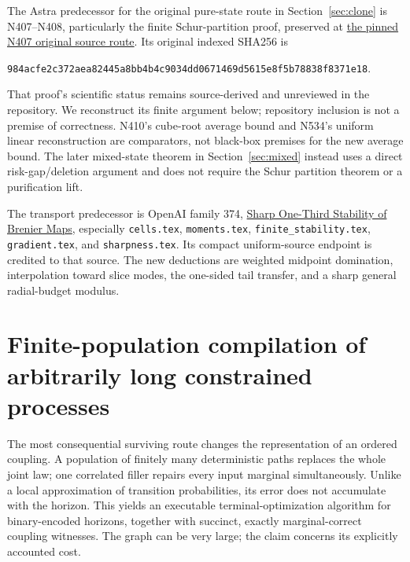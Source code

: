 \documentclass[11pt]{article}
\begin{document}
The Astra predecessor for the original pure-state route in Section~\ref{sec:clone} is N407--N408, particularly the finite Schur-partition proof, preserved at
\href{https://github.com/harjassand/astra-research-knowledge/blob/b2a7a8fa91a8fcf6da05f36100ae4ce64a72a729/web/pages/d-2115f1527533d2f7.html}{the pinned N407 original source route}.
Its original indexed SHA256 is
\begin{center}\small\texttt{984acfe2c372aea82445a8bb4b4c9034dd0671469d5615e8f5b78838f8371e18}.
\end{center}
That proof's scientific status remains source-derived and unreviewed in the repository. We reconstruct its finite argument below; repository inclusion is not a premise of correctness. N410's cube-root average bound and N534's uniform linear reconstruction are comparators, not black-box premises for the new average bound. The later mixed-state theorem in Section~\ref{sec:mixed} instead uses a direct risk-gap/deletion argument and does not require the Schur partition theorem or a purification lift.

The transport predecessor is OpenAI family 374,
\href{https://github.com/openai/math/tree/fd4aeeb2ee4fc729c18d98444fed42fd0529eeeb/preprints/Sharp-One-Third-Stability-of-Brenier-Maps-September-25-2026/build/source/sections}{Sharp One-Third Stability of Brenier Maps}, especially \texttt{cells.tex}, \texttt{moments.tex}, \texttt{finite\_stability.tex}, \texttt{gradient.tex}, and \texttt{sharpness.tex}. Its compact uniform-source endpoint is credited to that source. The new deductions are weighted midpoint domination, interpolation toward slice modes, the one-sided tail transfer, and a sharp general radial-budget modulus.

\section{Finite-population compilation of arbitrarily long constrained processes}\label{sec:population}

The most consequential surviving route changes the representation of an ordered coupling. A population of finitely many deterministic paths replaces the whole joint law; one correlated filler repairs every input marginal simultaneously. Unlike a local approximation of transition probabilities, its error does not accumulate with the horizon. This yields an executable terminal-optimization algorithm for binary-encoded horizons, together with succinct, exactly marginal-correct coupling witnesses. The graph can be very large; the claim concerns its explicitly accounted cost.
\end{document}
